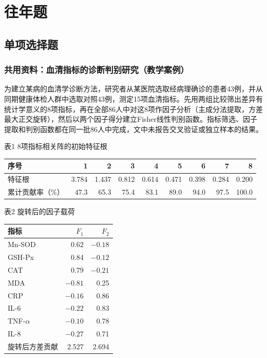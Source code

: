 
\label{chapter:4}

\section{往年题}

\subsection{单项选择题}

\subsubsection*{共用资料：血清指标的诊断判别研究（教学案例）}

为建立某病的血清学诊断方法，研究者从某医院选取经病理确诊的患者43例，并从同期健康体检人群中选取对照43例，测定15项血清指标。先用两组比较筛出差异有统计学意义的8项指标，再在全部86人中对这8项作因子分析（主成分法提取，方差最大正交旋转），然后以两个因子得分建立Fisher线性判别函数。指标筛选、因子提取和判别函数都在同一批86人中完成，文中未报告交叉验证或独立样本的结果。

表1 \quad 8项指标相关阵的初始特征根

\begin{center}\small\setlength{\tabcolsep}{4pt}\renewcommand{\arraystretch}{1.18}\begin{tabular}{@{}lrrrrrrrr@{}}
\toprule
序号 & 1 & 2 & 3 & 4 & 5 & 6 & 7 & 8 \\
\midrule
特征根 & 3.784 & 1.437 & 0.812 & 0.614 & 0.471 & 0.398 & 0.284 & 0.200 \\
累计贡献率（\%） & 47.3 & 65.3 & 75.4 & 83.1 & 89.0 & 94.0 & 97.5 & 100.0 \\
\bottomrule\end{tabular}\end{center}

表2 \quad 旋转后的因子载荷

\begin{center}\small\setlength{\tabcolsep}{6pt}\renewcommand{\arraystretch}{1.18}\begin{tabular}{@{}lrr@{}}
\toprule
指标 & \(F_1\) & \(F_2\) \\
\midrule
Mn-SOD & 0.62 & \(-0.18\) \\
GSH-Px & 0.84 & \(-0.12\) \\
CAT & 0.79 & \(-0.21\) \\
MDA & \(-0.81\) & 0.25 \\
CRP & \(-0.16\) & 0.86 \\
IL-6 & \(-0.22\) & 0.83 \\
TNF-\(\alpha\) & \(-0.10\) & 0.78 \\
IL-8 & \(-0.27\) & 0.71 \\
\midrule
旋转后方差贡献 & 2.527 & 2.694 \\
\bottomrule\end{tabular}\end{center}

